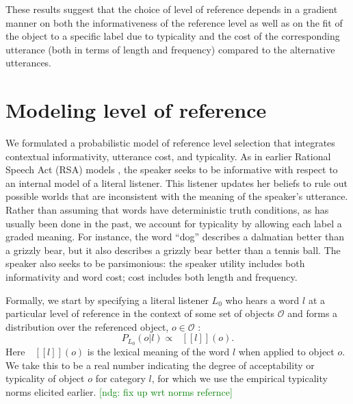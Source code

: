 \documentclass[10pt,letterpaper]{article}
\newcommand{\ndg}[1]{\textcolor{Green}{[ndg: #1]}}
\newcommand{\denote}[1]{\mbox{ $[\![ #1 ]\!]$}}
\begin{document}
These results suggest that the choice of level of reference depends in a gradient manner on both the informativeness of the reference level as well as on the fit of the object to a specific label due to typicality and the cost of the corresponding utterance (both in terms of length and frequency) compared to the alternative utterances.




\section{\bf Modeling level of reference}

We formulated a probabilistic model of reference level selection that integrates contextual informativity, utterance cost, and typicality.
As in earlier Rational Speech Act (RSA) models \cite{frank2012, goodmanstuhlmueller2013}, the speaker seeks to be informative with respect to an internal model of a literal listener. This listener updates her beliefs to rule out possible worlds that are inconsistent with the meaning of the speaker's utterance. Rather than assuming that words have deterministic truth conditions, as has usually been done in the past, we account for typicality by allowing each label a graded meaning. For instance, the word ``dog'' describes a dalmatian better than a grizzly bear, but it also describes a grizzly bear better than a tennis ball.
The speaker also seeks to be parsimonious: the speaker utility includes both informativity and word cost; cost includes both length and frequency.

Formally, we start by specifying a literal listener $L_0$ who hears a word $l$ at a particular level of reference  in the context of some set of objects $\mathcal{O}$ and forms a distribution over the referenced object, $o \in \mathcal{O}$ : 
$$P_{L_0}(o | l) \propto \denote{l}(o).$$
Here $\denote{l}(o)$ is the lexical meaning of the word $l$ when applied to object $o$. We take this to be a real number indicating the degree of acceptability or typicality of object $o$ for category $l$, for which we use the empirical typicality norms elicited earlier. \ndg{fix up wrt norms refernce}
\end{document}
